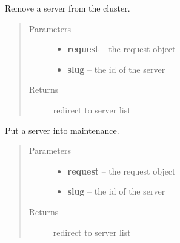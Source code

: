 \documentclass[letterpaper,10pt,english]{sphinxmanual}
\begin{document}

\begin{fulllineitems}
\label{api/cluster:limeade.cluster.views.server_delete}
Remove a server from the cluster.
\begin{quote}\begin{description}
\item[{Parameters}] \leavevmode\begin{itemize}
\item {} 
\textbf{request} -- the request object

\item {} 
\textbf{slug} -- the id of the server

\end{itemize}

\item[{Returns}] \leavevmode
redirect to server list

\end{description}\end{quote}

\end{fulllineitems}


\begin{fulllineitems}
\label{api/cluster:limeade.cluster.views.server_disable}
Put a server into maintenance.
\begin{quote}\begin{description}
\item[{Parameters}] \leavevmode\begin{itemize}
\item {} 
\textbf{request} -- the request object

\item {} 
\textbf{slug} -- the id of the server

\end{itemize}

\item[{Returns}] \leavevmode
redirect to server list

\end{description}\end{quote}

\end{fulllineitems}
\end{document}
